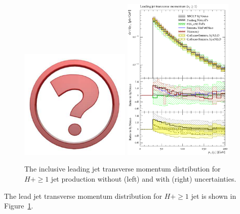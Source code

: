\begin{figure}[t!]
  \centering
  \includegraphics[width=0.47\textwidth]{Micon.pdf}
  \hfill
  \includegraphics[width=0.47\textwidth]{figures/hjetscomp_jet1_pT_incl.pdf}
  \caption{
    The inclusive leading jet transverse momentum distribution for
    $H+\ge1$ jet production without (left) and with (right) uncertainties.
    \label{fig:higgscomp:results:1obs:j1pt}
  }
\end{figure}

The lead jet transverse momentum distribution for $H+\ge1$ jet is
shown in Figure~\ref{fig:higgscomp:results:1obs:j1pt}.

